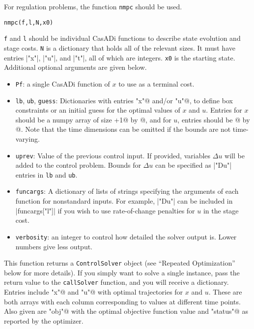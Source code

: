 \documentclass{article}
\providecommand{\lstinline}{}
\newcommand{\funcname}[2][.25em]{\vspace{#1}\noindent\texttt{#2}\nopagebreak\vspace{#1}}
\newcommand{\casadi}{CasADi}
\begin{document}
\begin{multicols}{2}
For regulation problems, the function \texttt{nmpc} should be used.

\funcname{nmpc(f,l,N,x0)}

\texttt{f} and \texttt{l} should be individual \casadi{} functions to describe state evolution and stage costs.
\texttt{N} is a dictionary that holds all of the relevant sizes.
It must have entries \lstinline|"x"|, \lstinline|"u"|, and \lstinline|"t"|, all of which are integers.
\texttt{x0} is the starting state.
Additional optional arguments are given below.

\begin{itemize}[noitemsep,nolistsep]
    \item \texttt{Pf}: a single \casadi{} function of $x$ to use as a terminal cost.
    \item \texttt{lb}, \texttt{ub}, \texttt{guess}: Dictionaries with entries \lstinline@"x"@ and/or \lstinline@"u"@, to define box constraints or an initial guess for the optimal values of $x$ and $u$.
    Entries for $x$ should be a numpy array of size \lstinline@N["t"]+1@ by \lstinline@N["x"]@, and for $u$, entries should be \lstinline@N["t"]@ by \lstinline@N["u"]@.
    Note that the time dimensions can be omitted if the bounds are not time-varying.
    \item \texttt{uprev}: Value of the previous control input.
    If provided, variables $\Delta u$ will be added to the control problem.
    Bounds for $\Delta u$ can be specified as \lstinline|"Du"| entries in \texttt{lb} and \texttt{ub}.
    \item \texttt{funcargs}: A dictionary of lists of strings specifying the arguments of each function for nonstandard inputs.
    For example, \lstinline|"Du"| can be included in \lstinline|funcargs["l"]| if you wish to use rate-of-change penalties for $u$ in the stage cost.
    \item \texttt{verbosity}: an integer to control how detailed the solver output is.
    Lower numbers give less output.
\end{itemize}

This function returns a \texttt{ControlSolver} object (see ``Repeated Optimization'' below for more details).
If you simply want to solve a single instance, pass the return value to the \texttt{callSolver} function, and you will receive a dictionary.
Entries include \lstinline@"x"@ and \lstinline@"u"@ with optimal trajectories for $x$ and $u$.
These are both arrays with each column corresponding to values at different time points.
Also given are \lstinline@"obj"@ with the optimal objective function value and \lstinline@"status"@ as reported by the optimizer.


\end{multicols}
\end{document}
